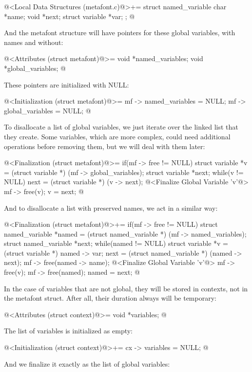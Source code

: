 \iniciocodigo
@<Local Data Structures (metafont.c)@>+=
struct named_variable{
  char *name;
  void *next;
  struct variable *var;
};
@
\fimcodigo

And the metafont structure will have pointers for these global
variables, with names and without:

\iniciocodigo
@<Attributes (struct metafont)@>=
  void *named_variables;
  void *global_variables;
@
\fimcodigo

These pointers are initialized with NULL:

\iniciocodigo
@<Initialization (struct metafont)@>=
mf -> named_variables = NULL;
mf -> global_variables = NULL;
@
\fimcodigo

To disallocate a list of global variables, we just iterate over the
linked list that they create. Some variables, which are more complex,
could need additional operations before removing them, but we will
deal with them later:

\iniciocodigo
@<Finalization (struct metafont)@>=
if(mf -> free != NULL){
  struct variable *v = (struct variable *) (mf -> global_variables);
  struct variable *next;
  while(v != NULL){
    next = (struct variable *) (v -> next);
    @<Finalize Global Variable 'v'@>
    mf -> free(v);
    v = next;
  }
}
@
\fimcodigo

And to disallocate a list with preserved names, we act in a similar
way:

\iniciocodigo
@<Finalization (struct metafont)@>+=
if(mf -> free != NULL){
  struct named_variable *named = (struct named_variable *)
                                   (mf -> named_variables);
  struct named_variable *next;
  while(named != NULL){
    struct variable *v = (struct variable *) named -> var;
    next = (struct named_variable *) (named -> next);
    mf -> free(named -> name);
    @<Finalize Global Variable 'v'@>
    mf -> free(v);
    mf -> free(named);
    named = next;
  }
}
@
\fimcodigo

In the case of variables that are not global, they will be stored in
contexts, not in the metafont struct. After all, their duration always
will be temporary:

\iniciocodigo
@<Attributes (struct context)@>=
  void *variables;
@
\fimcodigo

The list of variables is initialized as empty:

\iniciocodigo
@<Initialization (struct context)@>+=
cx -> variables = NULL;
@
\fimcodigo

And we finalize it exactly as the list of global variables:

